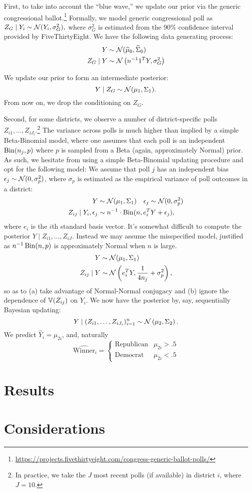 \documentclass[11pt]{article}
\begin{document}
First, to take into account the ``blue wave,'' we update our prior via the generic congressional ballot.\footnote{\url{https://projects.fivethirtyeight.com/congress-generic-ballot-polls/}} Formally, we model generic congressional poll as $Z_{G} \mid Y_i \sim \mathcal{N}(Y_i, \sigma_G^2),$ where $\sigma_G^2$ is estimated from the 90\% confidence interval provided by FiveThirtyEight. We have the following data generating process: \begin{align*}
Y &\sim \mathcal{N}(\widehat \mu_0, \widehat \Sigma_0)\\
Z_G \mid Y &\sim \mathcal{N}\left({n^{-1}1^T Y, \sigma_G^2}\right)
\end{align*}

We update our prior to form an intermediate posterior: \[
Y \mid Z_G \sim \mathcal{N}(\mu_1, \Sigma_1).
\]
From now on, we drop the conditioning on $Z_G$.

Second, for some districts, we observe a number of district-specific polls $Z_{i1},\ldots,Z_{iJ_i}$.\footnote{In practice, we take the $J$ most recent polls (if available) in district $i$, where $J = 10$.} The variance across polls is much higher than implied by a simple Beta-Binomial model, where one assumes that each poll is an independent $\operatorname{Bin}(n_j,p)$ where $p$ is sampled from a Beta (again, approximately Normal) prior. As such, we hesitate from using a simple Beta-Binomial updating procedure and opt for the following model: We assume that poll $j$ has an independent bias $\epsilon_j \sim \mathcal{N}(0, \sigma^2_p)$, where $\sigma_p$ is estimated as the empirical variance of poll outcomes in a district: \begin{align*}
Y &\sim \mathcal{N}(\mu_1, \Sigma_1) \quad \epsilon_j \sim \mathcal{N}(0, \sigma_p^2) \\
Z_{ij}\mid Y_i, \epsilon_j &\sim n^{-1} \cdot \operatorname{Bin}(n, e_i^T Y + \epsilon_j),
\end{align*}
where $e_i$ is the $i$th standard basis vector. It's somewhat difficult to compute the posterior $Y \mid Z_{i1}, \ldots, Z_{iJ}$. Instead we may assume the misspecified model, justified as $n^{-1}\operatorname{Bin}(n, p)$ is approximately Normal when $n$ is large. \begin{align*}
Y &\sim \mathcal{N}(\mu_{1}, \Sigma_{1}) \\
Z_{ij} \mid Y &\sim \mathcal{N}\left({e_i^TY, \frac{1}{4n_j} + \sigma_p^2}\right),
\end{align*}
so as to (a) take advantage of Normal-Normal conjugacy and (b) ignore the dependence of $\mathbb{V}(Z_{ij})$ on $Y_i$. We now have the posterior by, say, sequentially Bayesian updating: \[
Y \mid (Z_{i1},\ldots,Z_{iJ_i})_{i=1}^n \sim \mathcal{N}\left({
    \mu_{2}, \Sigma_{2}
}\right).
\]
We predict $\hat Y_i = \mu_{2i}$, and, naturally \[
\hat{\text{Winner}}_i = \begin{cases}
    \text{Republican} & \mu_{2i} > .5 \\
    \text{Democrat} & \mu_{2i} < .5
\end{cases}
\]

\section{Results}

\section{Considerations}




\end{document}
